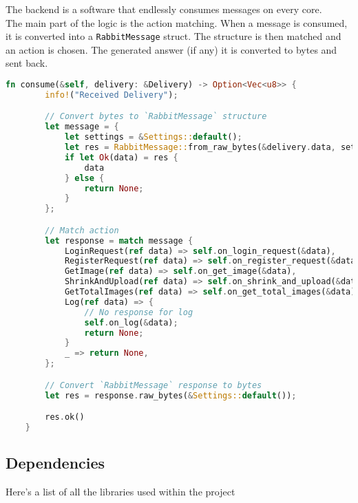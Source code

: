 \documentclass[../documentation.tex]{subfiles}
\begin{document}
The backend is a software that endlessly
consumes messages on every core.
\\
The main part of the logic is the action matching.
When a message is consumed, it is converted into a 
\texttt{RabbitMessage} struct. The structure is then matched
and an action is chosen. The generated answer (if any)
it is converted to bytes and sent back.

\begin{lstlisting}[language=Rust, style=boxed, numbers=none]
    fn consume(&self, delivery: &Delivery) -> Option<Vec<u8>> {
        info!("Received Delivery");

        // Convert bytes to `RabbitMessage` structure
        let message = {
            let settings = &Settings::default();
            let res = RabbitMessage::from_raw_bytes(&delivery.data, settings);
            if let Ok(data) = res {
                data
            } else {
                return None;
            }
        };

        // Match action
        let response = match message {
            LoginRequest(ref data) => self.on_login_request(&data),
            RegisterRequest(ref data) => self.on_register_request(&data),
            GetImage(ref data) => self.on_get_image(&data),
            ShrinkAndUpload(ref data) => self.on_shrink_and_upload(&data),
            GetTotalImages(ref data) => self.on_get_total_images(&data),
            Log(ref data) => {
                // No response for log
                self.on_log(&data);
                return None;
            }
            _ => return None,
        };

        // Convert `RabbitMessage` response to bytes
        let res = response.raw_bytes(&Settings::default());

        res.ok()
    }
\end{lstlisting}

\pagebreak

\subsection{Dependencies}

Here's a list of all the libraries used within the project
\end{document}
